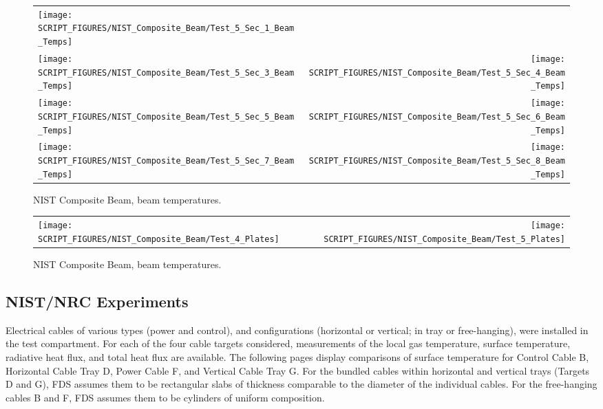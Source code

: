 \newpage

\begin{figure}[p]
\begin{tabular*}{\textwidth}{l@{\extracolsep{\fill}}r}
\texttt{[image: SCRIPT\_FIGURES/NIST\_Composite\_Beam/Test\_5\_Sec\_1\_Beam\_Temps]} &
 \\
\texttt{[image: SCRIPT\_FIGURES/NIST\_Composite\_Beam/Test\_5\_Sec\_3\_Beam\_Temps]} &
\texttt{[image: SCRIPT\_FIGURES/NIST\_Composite\_Beam/Test\_5\_Sec\_4\_Beam\_Temps]} \\
\texttt{[image: SCRIPT\_FIGURES/NIST\_Composite\_Beam/Test\_5\_Sec\_5\_Beam\_Temps]} &
\texttt{[image: SCRIPT\_FIGURES/NIST\_Composite\_Beam/Test\_5\_Sec\_6\_Beam\_Temps]} \\
\texttt{[image: SCRIPT\_FIGURES/NIST\_Composite\_Beam/Test\_5\_Sec\_7\_Beam\_Temps]} &
\texttt{[image: SCRIPT\_FIGURES/NIST\_Composite\_Beam/Test\_5\_Sec\_8\_Beam\_Temps]}
\end{tabular*}
\caption[NIST Composite Beam, beam temperatures]{NIST Composite Beam, beam temperatures.}
\label{NIST_CB_Beam}
\end{figure}

\begin{figure}[p]
\begin{tabular*}{\textwidth}{l@{\extracolsep{\fill}}r}
\texttt{[image: SCRIPT\_FIGURES/NIST\_Composite\_Beam/Test\_4\_Plates]} &
\texttt{[image: SCRIPT\_FIGURES/NIST\_Composite\_Beam/Test\_5\_Plates]} 
\end{tabular*}
\caption[NIST Composite Beam, beam temperatures]{NIST Composite Beam, beam temperatures.}
\label{NIST_CB_Plates}
\end{figure}



\clearpage

\subsection{NIST/NRC Experiments}

Electrical cables of various types (power and control), and configurations (horizontal or vertical; in tray or free-hanging), were installed in the test compartment. For each of the four cable targets considered, measurements of the local gas temperature, surface temperature, radiative heat flux, and total heat flux are available.  The following pages display comparisons of surface temperature for Control Cable B, Horizontal Cable Tray D, Power Cable F, and Vertical Cable Tray G. For the bundled cables within horizontal and vertical trays (Targets D and G), FDS assumes them to be rectangular slabs of thickness comparable to the diameter of the individual cables. For the free-hanging cables B and F, FDS assumes them to be cylinders of uniform composition.

